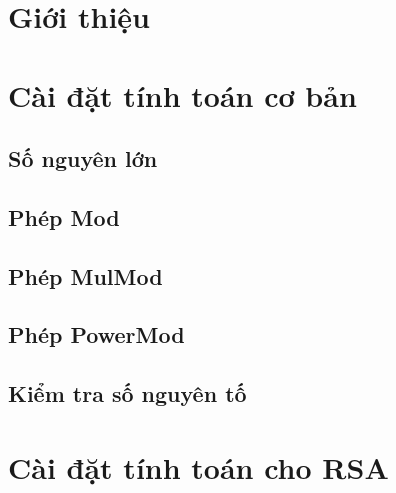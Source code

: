 \documentclass[12pt]{article}
\begin{document}



{
  \hypersetup{linkcolor=black}
  \tableofcontents\newpage\cleardoublepage
}


\section{Giới thiệu}
\newpage\cleardoublepage

\section{Cài đặt tính toán cơ bản}
\subsection{Số nguyên lớn}


\subsection{Phép Mod}


\subsection{Phép MulMod}


\subsection{Phép PowerMod}


\subsection{Kiểm tra số nguyên tố}

\cleardoublepage
\section{Cài đặt tính toán cho RSA}
\end{document}
